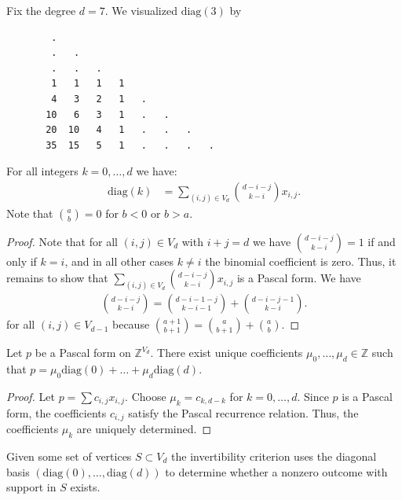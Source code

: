 \begin{example}
    Fix the degree \( d = 7 \). We visualized \( \mathrm{diag}(3) \) by
    \begin{verbatim}
        .
        .   .
        .   .   .
        1   1   1   1
        4   3   2   1   .
       10   6   3   1   .   .
       20  10   4   1   .   .   . 
       35  15   5   1   .   .   .   .
    \end{verbatim}
\end{example}

\begin{proposition}\label{prop:diagonal-basis-324324324231}
    For all integers \( k = 0, \dots, d \) we have:
    \begin{align*}
        \mathrm{diag}(k)  &= \sum_{(i,j) \in V_d}\binom{d - i - j}{k-i} x_{i,j}.
    \end{align*} 
    Note that \( \binom{a}{b} = 0 \) for \( b < 0 \) or \( b > a \).
\end{proposition}

\begin{proof}
    Note that for all \( (i,j) \in V_d \) with \( i+j = d \) we have \( \binom{d - i - j}{k-i} = 1 \) if and only if \( k= i \), and in all other cases \( k \neq i \) the binomial coefficient is zero. Thus, it remains to show that \( \sum_{(i,j) \in V_d}\binom{d - i - j}{k-i} x_{i,j} \) is a Pascal form. We have 
    \begin{align*}
        \binom{d-i-j}{k-i} = \binom{d-i-1-j}{k-i-1} + \binom{d-i-j-1}{k-i}.
    \end{align*}
    for all \( (i,j) \in V_{d-1} \) because \( \binom{a+1}{b+1} = \binom{a}{b+1} + \binom{a}{b}\).
\end{proof}

\begin{proposition}
    Let \( p \) be a Pascal form on \( \mathbb Z^{V_d} \). There exist unique coefficients \( \mu_0, \dots, \mu_d \in \mathbb{Z} \) such that 
    \( p = \mu_0 \mathrm{diag}(0) + \dots + \mu_d \mathrm{diag}(d) \).
\end{proposition}

\begin{proof}
    Let \( p = \sum c_{i,j}x_{i,j} \). Choose \( \mu_k = c_{k,d-k} \) for \( k=0, \dots, d \). Since \( p \) is a Pascal form, the coefficients \( c_{i,j} \) satisfy the Pascal recurrence relation. Thus, the coefficients \( \mu_k \) are uniquely determined.
\end{proof}

Given some set of vertices \( S \subset V_d \) the invertibility criterion uses the diagonal basis \( (\mathrm{diag}(0), \dots, \mathrm{diag}(d)) \) to determine whether a nonzero outcome with support in \( S \) exists.

